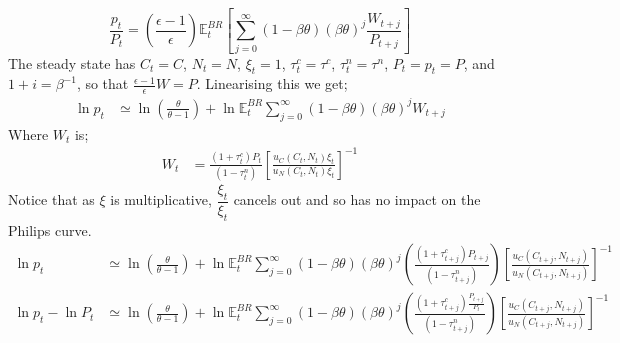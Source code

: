 \documentclass[11pt]{article}
\newcommand{\bb}{\bigbreak\noindent}
\begin{document}
\begin{spacing}{2}
\begin{equation}
	\frac{p_t}{P_t} = \left(\frac{\epsilon-1}{\epsilon}\right) \mathbb{E}_t^{BR} \left[\sum_{j=0}^{\infty} (1-\beta \theta)(\beta \theta)^j \frac{W_{t+j}}{P_{t+j}}\right]
\end{equation}
The steady state has $C_t = C$, $N_t = N$, $\xi_t = 1$, $\tau^c_t = \tau^c$, $\tau^n_t = \tau^n$, $P_t = p_t = P$, and $1+i = \beta^{-1}$, so that $\frac{\epsilon-1}{\epsilon} W = P$.
\bb
Linearising this we get;
\begin{align*}
	\ln p_t &\simeq \ln \left(\frac{\theta}{\theta - 1}\right) + \ln \mathbb{E}_t^{BR} \sum_{j=0}^{\infty} (1-\beta \theta)(\beta \theta)^j W_{t+j} 
\end{align*}
Where $W_t$ is;
\begin{align*}
			W_t &= \frac{\left(1 + \tau^c_t\right) P_t}{\left(1 - \tau^n_t\right)} 
		\left[\frac{u_C\left(C_t, N_t\right)\xi_t}{u_N\left(C_t, N_t \right)\xi_t}\right]^{-1} 
\end{align*}
Notice that as $\xi$ is multiplicative, $\dfrac{\xi_t}{\xi_t}$ cancels out and so has no impact on the Philips curve.
\begin{align*}
	\ln p_t &\simeq \ln \left(\frac{\theta}{\theta - 1}\right) + \ln \mathbb{E}_t^{BR} \sum_{j=0}^{\infty} (1-\beta \theta)(\beta \theta)^j
	\left(\frac{\left(1 + \tau^c_{t+j}\right) P_{t+j}}{\left(1 - \tau^n_{t+j}\right)}\right) 
	\left[\frac{u_C\left(C_{t+j}, N_{t+j}\right)}{u_N\left(C_{t+j}, N_{t+j}\right)}\right]^{-1} \\
	\ln p_t - \ln P_t &\simeq \ln \left(\frac{\theta}{\theta - 1}\right) + \ln \mathbb{E}_t^{BR} \sum_{j=0}^{\infty} (1-\beta \theta)(\beta \theta)^j
	\left(\frac{\left(1 + \tau^c_{t+j}\right) \frac{P_{t+j}}{P_t}}{\left(1 - \tau^n_{t+j}\right)}\right) 
	\left[\frac{u_C\left(C_{t+j}, N_{t+j}\right)}{u_N\left(C_{t+j}, N_{t+j}\right)}\right]^{-1}
\end{align*}


\end{spacing}
\end{document}
